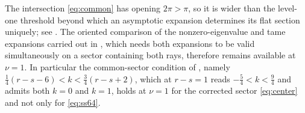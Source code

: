 \begin{remark}
  \label{rem:uniqueness}
  The intersection \eqref{eq:common} has opening \(2\pi>\pi\), so it is wider
  than the level-one threshold beyond which an asymptotic expansion
  determines its flat section uniquely; see \cite{Balser}.  The oriented
  comparison of the nonzero-eigenvalue and tame expansions carried out in
  \cite[Section~9]{SS}, which needs both expansions to be valid
  simultaneously on a sector containing both rays, therefore remains
  available at \(\nu=1\).  In particular the common-sector condition of
  \cite[Remark~1.6]{SS}, namely \(\tfrac14(r-s-6)<k<\tfrac34(r-s+2)\), which
  at \(r-s=1\) reads \(-\tfrac54<k<\tfrac94\) and admits both \(k=0\) and
  \(k=1\), holds at \(\nu=1\) for the corrected sector \eqref{eq:center} and
  not only for \eqref{eq:ss64}.
\end{remark}
